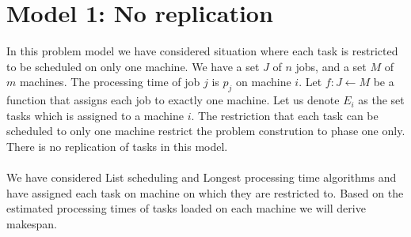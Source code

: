 \documentclass[10pt, conference, compsocconf]{IEEEtran}
\begin{document}
\section{Model 1: No replication} 
In this problem model we have considered  situation where each task is restricted to be scheduled on only one machine.  We have a set $J$ of $ n$ jobs, and a set $M$ of $m$ machines. The processing time of job $j$ is $p_{j}$ on machine $i$. Let $f : J \leftarrow M$ be a function that assigns each job to exactly one machine. Let us denote $E_{i}$ as the set tasks which is assigned to a machine $i$.  The restriction that each task can be scheduled to only one machine restrict the problem constrution to phase one only. There is no replication of tasks in this model.\\
\\
We have  considered List scheduling and Longest processing time algorithms and have  assigned each task on machine on which they are restricted to.   Based on the estimated processing times of  tasks loaded on each machine we will derive makespan. \\                                                                                                                                                                                                                                                                                                                                                                                                                                                                                                                                                                                                                                                                                                                                                                                                                                                                                                                                                                                                                                                                                                                                                                                                                                                                                                                                                                                                                                                                                                                                                                                                                                                                                                                                                                                                                                                                                                                                                                                                                                                                                                                                                                                                                          
\end{document}
